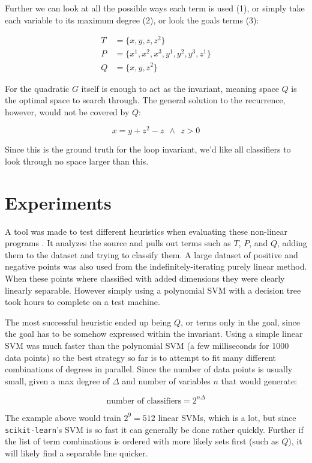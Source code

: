 \documentclass[letterpaper,twocolumn,10pt]{article}
\begin{document}
Further we can look at all the possible ways each term is used (1), or simply
take each variable to its maximum degree (2), or look the goals terms (3):

\begin{align}
  T &= \{x, y, z, z^2\} \\
  P &= \{x^1, x^2, x^3, y^1, y^2, y^3, z^1\} \\
  Q &= \{x, y, z^2\}
\end{align}

For the quadratic $G$ itself is enough to act as the invariant, meaning space
$Q$ is the optimal space to search through. The general solution to the
recurrence, however, would not be covered by $Q$:

$$
x = y + z^2 - z ~~\land~~ z > 0
$$

Since this is the ground truth for the loop invariant, we'd like all classifiers
to look through no space larger than this.


\section{Experiments}


A tool was made to test different heuristics when evaluating these non-linear
programs \cite{github}. It analyzes the source and pulls out terms such as $T$,
$P$, and $Q$, adding them to the dataset and trying to classify them.
A large dataset of positive and negative points was also used from the
indefinitely-iterating purely linear method. When these points where classified
with added dimensions they were clearly linearly separable. However simply using
a polynomial SVM with a decision tree took hours to complete on a test machine.

The most successful heuristic ended up being $Q$, or terms only in the goal,
since the goal has to be somehow expressed within the invariant. Using a simple
linear SVM was much faster than the polynomial SVM (a few milliseconds for 1000
data points) so the best strategy so far is to attempt to fit many different
combinations of degrees in parallel. Since the number of data points is usually
small, given a max degree of $\Delta$ and number of variables $n$ that would
generate:

$$
\text{number of classifiers} = 2^{n\Delta}
$$

The example above would train $2^9 = 512$ linear SVMs, which is a lot, but since
\texttt{scikit-learn}'s SVM is so fast it can generally be done rather quickly.
Further if the list of term combinations is ordered with more likely sets first
(such as $Q$), it will likely find a separable line quicker.
\end{document}
